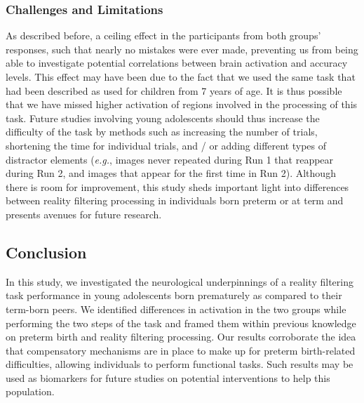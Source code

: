 \subsubsection{Challenges and Limitations} \label{sub:limitations}
 As described before, a ceiling effect in the participants from both groups' responses, such that nearly no mistakes were ever made, preventing us from being able to investigate potential correlations between brain activation and accuracy levels. This effect may have been due to the fact that we used the same task that had been described as used for children from 7 years of age. It is thus possible that we have missed higher activation of regions involved in the processing of this task. Future studies involving young adolescents should thus increase the difficulty of the task by methods such as increasing the number of trials, shortening the time for individual trials, and / or adding different types of distractor elements (\textit{e.g.}, images never repeated during Run 1 that reappear during Run 2, and images that appear for the first time in Run 2). Although there is room for improvement, this study sheds important light into differences between reality filtering processing in individuals born preterm or at term and presents avenues for future research.

\subsection{Conclusion}
In this study, we investigated the neurological underpinnings of a reality filtering task performance in young adolescents born prematurely as compared to their term-born peers. We identified differences in activation in the two groups while performing the two steps of the task and framed them within previous knowledge on preterm birth and reality filtering processing. Our results corroborate the idea that compensatory mechanisms are in place to make up for preterm birth-related difficulties, allowing individuals to perform functional tasks. Such results may be used as biomarkers for future studies on potential interventions to help this population. 



